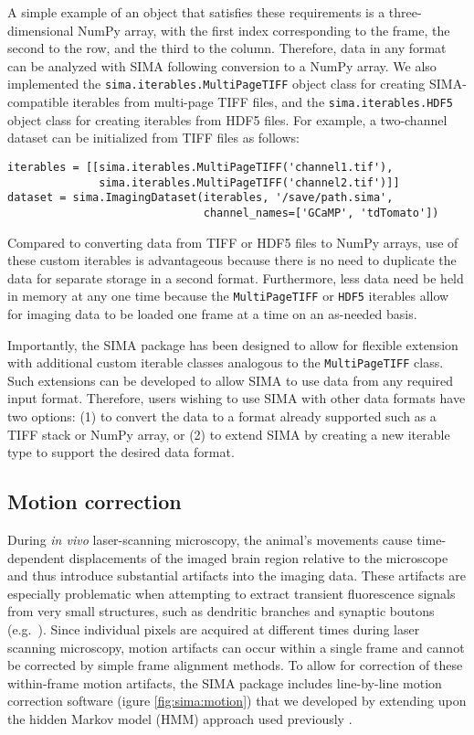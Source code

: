 A simple example of an object that satisfies these requirements is a three-dimensional NumPy array,
with the first index corresponding to the frame, the second to the row, and the third to the column. 
Therefore, data in any format can be analyzed with SIMA following conversion
to a NumPy array.
We also implemented the \verb|sima.iterables.MultiPageTIFF| object class
for creating SIMA-compatible iterables from multi-page TIFF files,
and the \verb|sima.iterables.HDF5| object class for creating iterables from HDF5 files.
For example, a two-channel dataset can be initialized from TIFF files as follows:
\begin{verbatim}
iterables = [[sima.iterables.MultiPageTIFF('channel1.tif'),
              sima.iterables.MultiPageTIFF('channel2.tif')]]
dataset = sima.ImagingDataset(iterables, '/save/path.sima',
                              channel_names=['GCaMP', 'tdTomato'])
\end{verbatim}
Compared to converting data from TIFF or HDF5 files to NumPy arrays,
use of these custom iterables is advantageous because there is no need to
duplicate the data for separate storage in a second format.
Furthermore, less data need be held in memory at any one time because the
\verb|MultiPageTIFF| or  \verb|HDF5| iterables allow for imaging data
to be loaded one frame at a time on an as-needed basis.

Importantly, the SIMA package has been designed to allow for flexible extension
with additional custom iterable classes analogous to the \verb|MultiPageTIFF| class.
Such extensions can be developed to allow SIMA to use data from any required
input format.
Therefore, users wishing to use SIMA with other data formats have two options:
(1) to convert the data to a format already supported such as a TIFF stack or NumPy array,
or (2) to extend SIMA by creating a new iterable type to support the desired
data format.

\subsection{Motion correction}
During \textit{in vivo} laser-scanning microscopy, the animal's movements cause 
time-dependent displacements of the imaged brain region relative to the microscope and 
thus introduce substantial artifacts into the imaging data.
These artifacts are especially problematic when attempting to extract transient fluorescence 
signals from very small structures, such as dendritic branches and synaptic boutons (e.g.\ \citep{Kaifosh2013}).
Since individual pixels are acquired at different times during laser scanning microscopy,
motion artifacts can occur within a single frame and cannot be corrected by simple frame 
alignment methods.
To allow for correction of these within-frame motion artifacts, 
the SIMA package includes line-by-line motion correction software (igure \ref{fig:sima:motion})
that we developed \citep{Kaifosh2013}
by extending upon the hidden Markov model (HMM) approach used previously \citep{Dombeck2007}.

